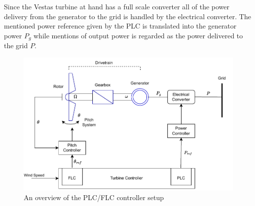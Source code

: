 Since the Vestas turbine at hand has a full scale converter all of the power delivery from the generator to the grid is handled by the electrical converter. The mentioned power reference given by the PLC is translated into the generator power $ P_g $ while mentions of output power is regarded as the power delivered to the grid $ P $.

\begin{figure}[ht]
	\centering
	\includegraphics[width=0.7\linewidth]{Graphics/PLC_PI.pdf}
	\caption{An overview of the PLC/FLC controller setup}
	\label{fig:controller_overview}
\end{figure}

